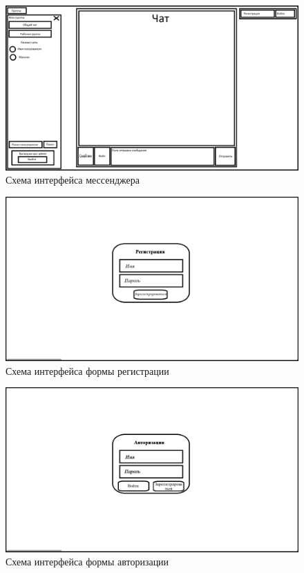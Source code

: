 \begin{figure}[h]
	\centering
	\includegraphics[width=0.8\linewidth]{"images/UI макет"}
	\caption{Схема интерфейса мессенджера}
	\label{fig:ui-main}
\end{figure}

\begin{figure}[h]
	\centering
	\includegraphics[width=0.8\linewidth]{"images/UI макет регистрации"}
	\caption{Схема интерфейса формы регистрации}
	\label{fig:ui-reg}
\end{figure}

\begin{figure}[h]
	\centering
	\includegraphics[width=0.8\linewidth]{"images/UI макет авторизации"}
	\caption{Схема интерфейса формы авторизации}
	\label{fig:ui-auth}
\end{figure}

